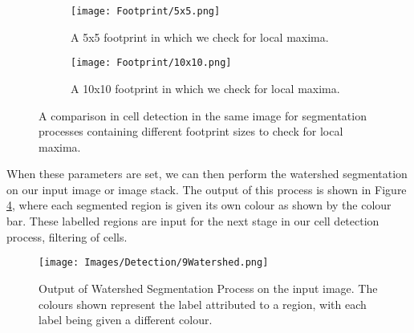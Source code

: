 \documentclass[12pt a4paper]{article}
\begin{document}
\begin{figure}
  \centering
  \begin{subfigure}{.5\textwidth}
  \centering
  \texttt{[image: Footprint/5x5.png]}
  \caption{A 5x5 footprint in which we check for local maxima.}
  \label{fig:sub-5}
\end{subfigure}%
\begin{subfigure}{.5\textwidth}
  \centering
  \texttt{[image: Footprint/10x10.png]}
  \caption{A 10x10 footprint in which we check for local maxima.}
  \label{fig:sub-10}
\end{subfigure}
  \caption{A comparison in cell detection in the same image for segmentation processes containing different footprint sizes to check for local maxima.}
  \label{fig:footprint}
\end{figure}

When these parameters are set, we can then perform the watershed segmentation on our input image or image stack. The output of this process is shown in Figure \ref{fig:watershed}, where each segmented region is given its own colour as shown by the colour bar. These labelled regions are input for the next stage in our cell detection process, filtering of cells.

\begin{figure}
    \centering
    \texttt{[image: Images/Detection/9Watershed.png]}
    \caption{Output of Watershed Segmentation Process on the input image. The colours shown represent the label attributed to a region, with each label being given a different colour.}
    \label{fig:watershed}
\end{figure}
\end{document}

